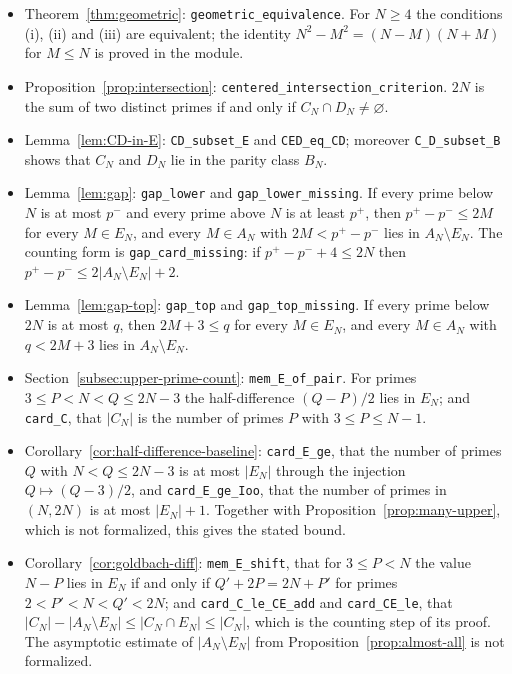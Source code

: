 \documentclass[11pt]{amsart}
\theoremstyle{definition}
\theoremstyle{remark}
\begin{document}
\begin{itemize}
\item Theorem~\ref{thm:geometric}: \texttt{geometric\_equivalence}. For $N\geq 4$ the conditions (i), (ii) and (iii) are equivalent; the identity $N^2-M^2=(N-M)(N+M)$ for $M\leq N$ is proved in the module.
\item Proposition~\ref{prop:intersection}: \texttt{centered\_intersection\_criterion}. $2N$ is the sum of two distinct primes if and only if $C_N\cap D_N\neq\varnothing$.
\item Lemma~\ref{lem:CD-in-E}: \texttt{CD\_subset\_E} and \texttt{CED\_eq\_CD}; moreover \texttt{C\_D\_subset\_B} shows that $C_N$ and $D_N$ lie in the parity class $B_N$.
\item Lemma~\ref{lem:gap}: \texttt{gap\_lower} and \texttt{gap\_lower\_missing}. If every prime below $N$ is at most $p^-$ and every prime above $N$ is at least $p^+$, then $p^+-p^-\leq 2M$ for every $M\in E_N$, and every $M\in A_N$ with $2M<p^+-p^-$ lies in $A_N\setminus E_N$. The counting form is \texttt{gap\_card\_missing}: if $p^+-p^-+4\leq 2N$ then $p^+-p^-\leq 2|A_N\setminus E_N|+2$.
\item Lemma~\ref{lem:gap-top}: \texttt{gap\_top} and \texttt{gap\_top\_missing}. If every prime below $2N$ is at most $q$, then $2M+3\leq q$ for every $M\in E_N$, and every $M\in A_N$ with $q<2M+3$ lies in $A_N\setminus E_N$.
\item Section~\ref{subsec:upper-prime-count}: \texttt{mem\_E\_of\_pair}. For primes $3\leq P<N<Q\leq 2N-3$ the half-difference $(Q-P)/2$ lies in $E_N$; and \texttt{card\_C}, that $|C_N|$ is the number of primes $P$ with $3\leq P\leq N-1$.
\item Corollary~\ref{cor:half-difference-baseline}: \texttt{card\_E\_ge}, that the number of primes $Q$ with $N<Q\leq 2N-3$ is at most $|E_N|$ through the injection $Q\mapsto(Q-3)/2$, and \texttt{card\_E\_ge\_Ioo}, that the number of primes in $(N,2N)$ is at most $|E_N|+1$. Together with Proposition~\ref{prop:many-upper}, which is not formalized, this gives the stated bound.
\item Corollary~\ref{cor:goldbach-diff}: \texttt{mem\_E\_shift}, that for $3\leq P<N$ the value $N-P$ lies in $E_N$ if and only if $Q'+2P=2N+P'$ for primes $2<P'<N<Q'<2N$; and \texttt{card\_C\_le\_CE\_add} and \texttt{card\_CE\_le}, that $|C_N|-|A_N\setminus E_N|\leq|C_N\cap E_N|\leq|C_N|$, which is the counting step of its proof. The asymptotic estimate of $|A_N\setminus E_N|$ from Proposition~\ref{prop:almost-all} is not formalized.

\end{itemize}
\end{document}
